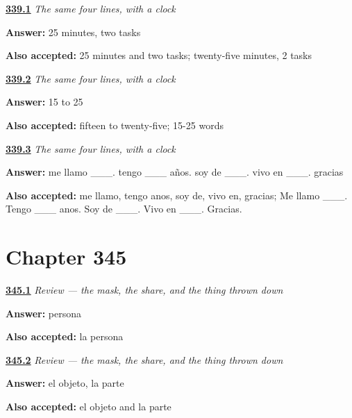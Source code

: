 \noindent\begin{minipage}[t]{\linewidth}
\raggedright
\hyperlink{review-ES-W01-con-reloj-clock}{\textbf{339.1}} \emph{The same four lines, with a clock}\par
\small \textbf{Answer:} 25 minutes, two tasks\par
\footnotesize \textbf{Also accepted:} 25 minutes and two tasks; twenty-five minutes, 2 tasks
\end{minipage}\par\medskip

\noindent\begin{minipage}[t]{\linewidth}
\raggedright
\hyperlink{review-ES-W01-con-reloj-length}{\textbf{339.2}} \emph{The same four lines, with a clock}\par
\small \textbf{Answer:} 15 to 25\par
\footnotesize \textbf{Also accepted:} fifteen to twenty-five; 15-25 words
\end{minipage}\par\medskip

\noindent\begin{minipage}[t]{\linewidth}
\raggedright
\hyperlink{review-ES-W01-con-reloj-criteria}{\textbf{339.3}} \emph{The same four lines, with a clock}\par
\small \textbf{Answer:} me llamo \_\_\_. tengo \_\_\_ años. soy de \_\_\_. vivo en \_\_\_. gracias\par
\footnotesize \textbf{Also accepted:} me llamo, tengo anos, soy de, vivo en, gracias; Me llamo \_\_\_. Tengo \_\_\_ anos. Soy de \_\_\_. Vivo en \_\_\_. Gracias.
\end{minipage}\par\medskip

\section*{Chapter 345}

\noindent\begin{minipage}[t]{\linewidth}
\raggedright
\hyperlink{review-ES-C345-repaso-persona-objeto-mask}{\textbf{345.1}} \emph{Review — the mask, the share, and the thing thrown down}\par
\small \textbf{Answer:} persona\par
\footnotesize \textbf{Also accepted:} la persona
\end{minipage}\par\medskip

\noindent\begin{minipage}[t]{\linewidth}
\raggedright
\hyperlink{review-ES-C345-repaso-persona-objeto-grammar}{\textbf{345.2}} \emph{Review — the mask, the share, and the thing thrown down}\par
\small \textbf{Answer:} el objeto, la parte\par
\footnotesize \textbf{Also accepted:} el objeto and la parte
\end{minipage}\par\medskip

